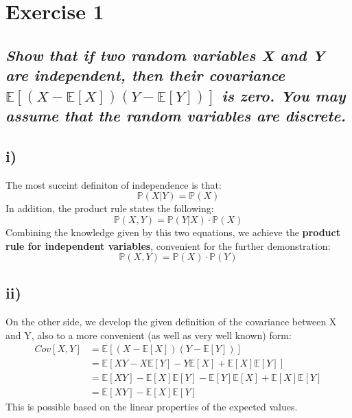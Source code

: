 \documentclass[11pt]{scrartcl} %
\begin{document}
\section*{\\[3mm]Exercise 1}
\subsection*{{\it Show that if two random variables X and Y are independent, then their covariance \(\mathbb{E}[(X-\mathbb{E}[X])(Y-\mathbb{E}[Y])]\) is zero. You may assume that the random variables are discrete.}}

\subsection*{i)}
The most succint definiton of independence is that:
\begin{equation}\label{eq:1}
  \mathbb{P}(X|Y) = \mathbb{P}(X)
\end{equation}
In addition, the product rule states the following:
\begin{equation}\label{eq:2}
  \mathbb{P}(X,Y) = \mathbb{P}(Y|X)\cdot\mathbb{P}(X)
\end{equation}
Combining the knowledge given by this two equations, we achieve the \textbf{product rule for independent variables}, convenient for the further demonstration:
\begin{equation}\label{eq:3}
  \mathbb{P}(X,Y) = \mathbb{P}(X)\cdot\mathbb{P}(Y)
\end{equation}

\subsection*{ii)}
On the other side, we develop the given definition of the covariance between X and Y, also to a more convenient (as well as very well known) form:
\begin{equation}\label{eq:4}
  \begin{split}
    Cov[X,Y] &= \mathbb{E}[(X-\mathbb{E}[X])(Y-\mathbb{E}[Y])]\\
    &= \mathbb{E}[XY - X\mathbb{E}[Y]-Y\mathbb{E}[X]+\mathbb{E}[X]\mathbb{E}[Y]]\\
    &= \mathbb{E}[XY]-\mathbb{E}[X]\mathbb{E}[Y]-\mathbb{E}[Y]\mathbb{E}[X]+\mathbb{E}[X]\mathbb{E}[Y]\\
    &= \mathbb{E}[XY]-\mathbb{E}[X]\mathbb{E}[Y]
  \end{split}
\end{equation}
This is possible based on the linear properties of the expected values.
\end{document}

